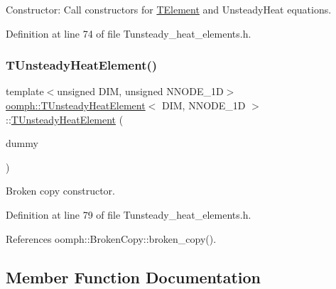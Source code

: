 Constructor\+: Call constructors for \hyperlink{classoomph_1_1TElement}{T\+Element} and Unsteady\+Heat equations. 



Definition at line 74 of file Tunsteady\+\_\+heat\+\_\+elements.\+h.

\mbox{\label{classoomph_1_1TUnsteadyHeatElement_a151aad04a5236dc5cf86576b179278c8}} 
\subsubsection{\texorpdfstring{T\+Unsteady\+Heat\+Element()}{TUnsteadyHeatElement()}\hspace{0.1cm}{\footnotesize\ttfamily [2/2]}}
{\footnotesize\ttfamily template$<$unsigned D\+IM, unsigned N\+N\+O\+D\+E\+\_\+1D$>$ \\
\hyperlink{classoomph_1_1TUnsteadyHeatElement}{oomph\+::\+T\+Unsteady\+Heat\+Element}$<$ D\+IM, N\+N\+O\+D\+E\+\_\+1D $>$\+::\hyperlink{classoomph_1_1TUnsteadyHeatElement}{T\+Unsteady\+Heat\+Element} (\begin{DoxyParamCaption}\item[{const \hyperlink{classoomph_1_1TUnsteadyHeatElement}{T\+Unsteady\+Heat\+Element}$<$ D\+IM, N\+N\+O\+D\+E\+\_\+1D $>$ \&}]{dummy }\end{DoxyParamCaption})\hspace{0.3cm}{\ttfamily [inline]}}



Broken copy constructor. 



Definition at line 79 of file Tunsteady\+\_\+heat\+\_\+elements.\+h.



References oomph\+::\+Broken\+Copy\+::broken\+\_\+copy().



\subsection{Member Function Documentation}
\mbox{\label{classoomph_1_1TUnsteadyHeatElement_a0e7b03ebbf897295a34bae8d0dfe9686}} 
